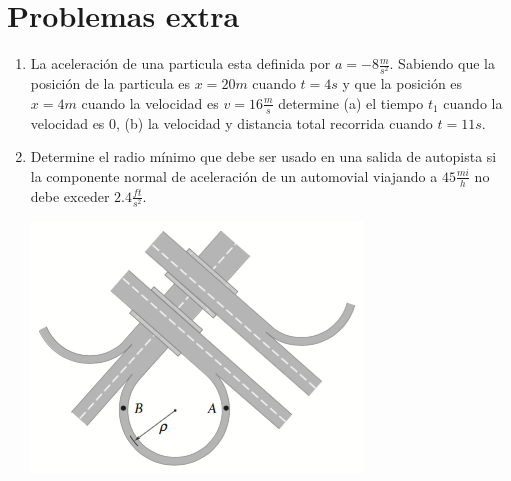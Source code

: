 
\section{Problemas extra}

\begin{enumerate}
	\item La aceleración de una particula esta definida por $a = -8 \frac{m}{s^2}$. Sabiendo que la posición de la particula es $x = 20m$ cuando $t = 4s$ y que la posición es $x = 4m$ cuando la velocidad es $v = 16 \frac{m}{s}$ determine (a) el tiempo $t_1$ cuando la velocidad es $0$, (b) la velocidad y distancia total recorrida cuando $t = 11s$.

	\item Determine el radio mínimo que debe ser usado en una salida de autopista si la componente normal de aceleración de un automovial viajando a $45 \frac{mi}{h}$ no debe exceder $2.4 \frac{ft}{s^2}.$

	\begin{marginfigure}
		\begin{center}
			\includegraphics[width=\textwidth]{./images/autopista.png}
		\end{center}
	\end{marginfigure}
\end{enumerate}



